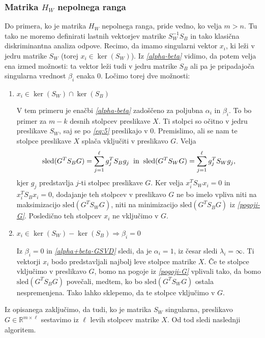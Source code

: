 \documentclass[mat1]{article}
\theoremstyle{definition}
\begin{document}

\subsubsection{Matrika $H_W$ nepolnega ranga}
Do primera, ko je matrika $H_W$ nepolnega ranga, pride vedno, ko velja $m>n$. Tu tako ne moremo definirati lastnih vektorjev matrike $S_W^{-1} S_B$ in tako klasična diskriminantna analiza odpove. Recimo, da imamo singularni vektor $x_i$, ki leži v jedru matrike $S_W$ (torej $x_i \in \ker (S_W)$).  Iz \textit{\eqref{alpha-beta}} vidimo, da potem velja ena izmed možnosti: ta vektor leži tudi v jedru matrike $S_B$ ali pa je pripadajoča singularna vrednost $\beta_i$ enaka 0. Ločimo torej dve možnosti:
\begin{enumerate}
\item{$x_i \in \ker (S_W) \cap \ker (S_B)$}

V tem primeru je enačbi \textit{\eqref{alpha-beta}} zadoščeno za poljubna $\alpha_i$ in $\beta_i$. To bo primer za $m-k$ desnih stolpcev preslikave $X$. Ti stolpci so očitno v jedru preslikave $S_W$, saj se po \textit{\eqref{eq:5}} preslikajo v 0. Premislimo, ali se nam te stolpce preslikave $X$ splača vključiti v preslikavo $G$. Velja
$$
\text{sled}(G^T S_B G) = \sum_{j = 1}^{\ell} g_j^T S_B g_j
\hspace{2mm}
\text{in}
\hspace{2mm}
\text{sled}(G^T S_W G) = \sum_{j = 1}^{\ell} g_j^T S_W g_j
\text{,}
$$
kjer $g_j$ predstavlja $j$-ti stolpec preslikave $G$. Ker velja $x_i^T S_W x_i = 0$ in $x_i^T S_B x_i = 0$, dodajanje teh stolpcev v preslikavo $G$ ne bo imelo vpliva niti na maksimizacijo $\text{sled} \left( G^T S_W G \right)$, niti na minimizacijo $\text{sled} \left( G^T S_B G \right)$ iz \textit{\eqref{pogoji-G}}. Posledično teh stolpcev $x_i$ ne vključimo v $G$.

\item{$x_i \in \ker (S_W) - \ker (S_B) 	\Rightarrow \beta_i = 0$}

Iz $\beta_i = 0$ in \textit{\eqref{alpha+beta-GSVD}} sledi, da je $\alpha_i = 1$, iz česar sledi $\lambda_i = \infty$. Ti vektorji $x_i$ bodo predstavljali najbolj leve stolpce matrike $X$. Če te stolpce vključimo v preslikavo $G$, bomo na pogoje iz \textit{\eqref{pogoji-G}} vplivali tako, da bomo $\text{sled}(G^T S_B G)$ povečali, medtem, ko bo $\text{sled}(G^T S_W G)$ ostala nespremenjena. Tako lahko sklepemo, da te stolpce vključimo v $G$.
\end{enumerate}
Iz opisanega zaključimo, da tudi, ko je matrika $S_W$ singularna, preslikavo $G \in \mathbb{R}^{m \times \ell}$ sestavimo iz $\ell$ levih stolpcev matrike $X$. Od tod sledi naslednji algoritem.
\end{document}
